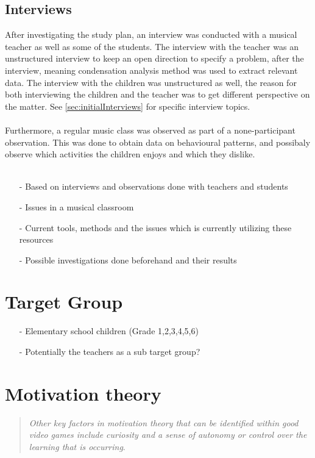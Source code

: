 	\subsection{Interviews}
	After investigating the study plan, an interview was conducted with a musical teacher as well as some of the students. The interview with the teacher was an unstructured interview to keep an open direction to specify a problem, after the interview, meaning condensation analysis method was used to extract relevant data. The interview with the children was unstructured as well, the reason for both interviewing the children and the teacher was to get different perspective on the matter. See \autoref{sec:initialInterviews} for specific interview topics.
	\\\\
	Furthermore, a regular music class was observed as part of a none-participant observation. This was done to obtain data on behavioural patterns, and possibaly observe which activities the children enjoys and which they dislike. 
	\\\\
	\begin{itemize}
	\item[-] Based on interviews and observations done with teachers and students
	\item[-] Issues in a musical classroom
	\item[-] Current tools, methods and the issues which is currently utilizing these resources
	\item[-] Possible investigations done beforehand and their results	
\end{itemize}

\section{Target Group}

\begin{itemize}
	\item[-] Elementary school children (Grade 1,2,3,4,5,6)
	\item[-] Potentially the teachers as a sub target group?
\end{itemize}

\section{Motivation theory}
\begin{quote}
	\textit{Other key factors in motivation theory that can be identified within good video games include curiosity and a sense of autonomy or control over the learning that is occurring}\cite[p.~92]{interactiveMusicVideoGames}.\\
\end{quote}
